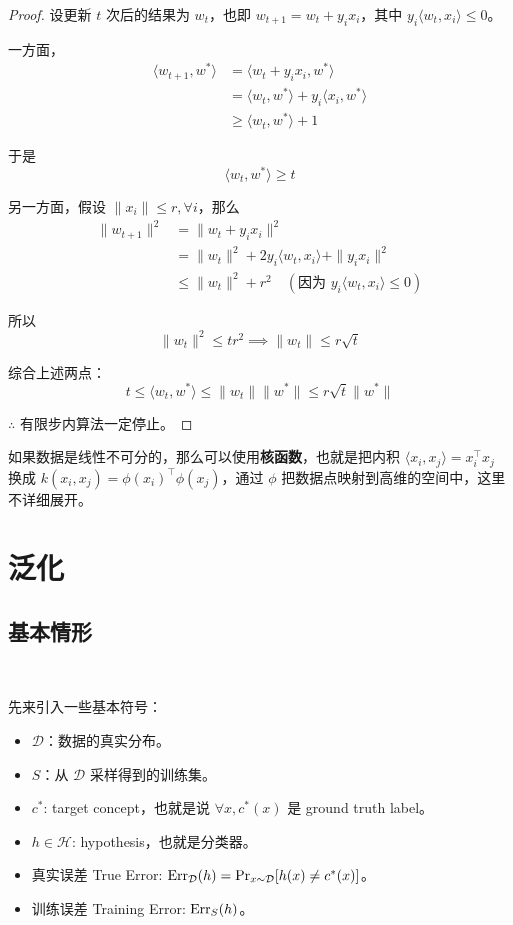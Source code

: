 \begin{proof}
    设更新 $t$ 次后的结果为 $w_t$，也即 $w_{t+1} = w_t + y_i x_i$，其中 $y_i \langle w_t, x_i \rangle \le 0$。

    一方面，
    \begin{align*}
        \langle w_{t+1}, w^* \rangle &= \langle w_t + y_i x_i, w^* \rangle \\
        &= \langle w_t, w^* \rangle + y_i \langle x_i, w^* \rangle \\
        &\ge \langle w_t, w^* \rangle + 1
    \end{align*}

    于是
    \[
        \langle w_t, w^* \rangle \ge t
    \]

    另一方面，假设 $\|x_i\| \le r, \forall i$，那么
    \begin{align*}
        \|w_{t+1}\|^2 &= \|w_t + y_i x_i\|^2 \\
        &= \|w_t\|^2 + 2 y_i \langle w_t, x_i \rangle + \|y_i x_i\|^2 \\
        &\le \|w_t\|^2 + r^2 \quad (\text{因为 } y_i \langle w_t, x_i \rangle \le 0)
    \end{align*}
    
    所以
    \[
        \|w_t\|^2 \le t r^2 \implies \|w_t\| \le r\sqrt{t}
    \]

    综合上述两点：
    \[
        t \le \langle w_t, w^* \rangle \le \|w_t\| \|w^*\| \le r\sqrt{t} \|w^*\|
    \]

    $\therefore$ 有限步内算法一定停止。
\end{proof}

如果数据是线性不可分的，那么可以使用\textbf{核函数}，也就是把内积 $\langle x_i, x_j \rangle = x_i^\top x_j$ 换成 $k(x_i, x_j) = \phi(x_i)^\top \phi(x_j)$，通过 $\phi$ 把数据点映射到高维的空间中，这里不详细展开。

\section{泛化}

\subsection{基本情形} ~

先来引入一些基本符号：

\begin{itemize}[noitemsep]
    \item $\mathcal{D}$：数据的真实分布。
    \item $S$：从 $\mathcal{D}$ 采样得到的训练集。
    \item $c^*$: target concept，也就是说 $\forall x, c^*(x)$ 是 ground truth label。
    \item $h \in \mathcal{H}$: hypothesis，也就是分类器。
    \item 真实误差 True Error: $\text{Err}_{\mathcal{D}}(h) = \Pr_{x \sim \mathcal{D}}[h(x) \ne c^*(x)]$。
    \item 训练误差 Training Error: $\text{Err}_S(h)$。
\end{itemize}

